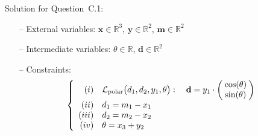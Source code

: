 \documentclass[12pt,a4paper,fleqn]{article}
\author{Simon Rohou}
\begin{document}
Solution for Question~C.1:
\begin{itemize}
	\item[--] External variables: $\mathbf{x}\in\mathbb{R}^3$, $\mathbf{y}\in\mathbb{R}^2$, $\mathbf{m}\in\mathbb{R}^2$
	\item[--] Intermediate variables: $\theta\in\mathbb{R}$, $\mathbf{d}\in\mathbb{R}^2$
	\item[--] Constraints:
	\begin{equation*}
	\left\{ \begin{array}{rl}
	(i) & \mathcal{L}_\textrm{polar}\big(d_1,d_2,y_1,\theta\big):~~~\mathbf{d}=y_1\cdot\left(\hspace{-0.1cm}\begin{array}{c}
	\cos(\theta)\\
	\sin(\theta)
	\end{array}\hspace{-0.1cm}\right)\\
	(ii) & d_1 = m_1-x_1 \\
	(iii) & d_2 = m_2-x_2 \\
	(iv) & \theta=x_3+y_2 \\
	\end{array}\right.
	\end{equation*}
\end{itemize}
\end{document}
